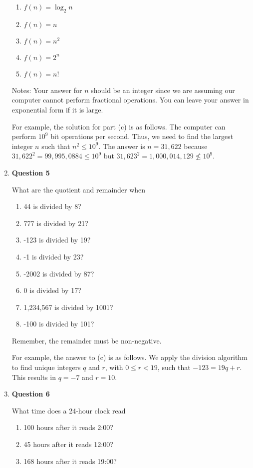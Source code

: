 \documentclass[11pt]{article}
\begin{document}
\begin{enumerate}
\begin{enumerate}[label=(\alph*)]
\item $f(n) = \log_2 n$
\item $f(n) = n$
\item $f(n) = n^2$
\item $f(n) = 2^n$
\item $f(n) = n!$
\end{enumerate}

Notes: Your answer for $n$ should be an integer since we are assuming our computer cannot perform fractional operations. You can leave your answer in exponential form if it is large.

For example, the solution for part (c) is as follows. The computer can perform $10^9$ bit operations per second. Thus, we need to find the largest integer $n$ such that $n^2 \leq 10^9$. The answer is $n=31,622$ because $31,622^2 = 99,995,0884 \leq 10^9$ but $31,623^2 = 1,000,014,129 \nleq 10^9$.

\item
\textbf{Question 5}

What are the quotient and remainder when 

\begin{enumerate}[label=(\alph*)]
\item 44 is divided by 8?
\item 777 is divided by 21?
\item -123 is divided by 19?
\item -1 is divided by 23?
\item -2002 is divided by 87?
\item 0 is divided by 17?
\item 1,234,567 is divided by 1001?
\item -100 is divided by 101?
\end{enumerate}

Remember, the remainder must be non-negative.

For example, the answer to (c) is as follows. We apply the division algorithm to find unique integers $q$ and $r$, with $0 \leq r < 19$, such that $-123 = 19q + r$. This results in $q=-7$ and $r=10$.

\item
\textbf{Question 6}

What time does a 24-hour clock read 

\begin{enumerate}[label=(\alph*)]
\item 100 hours after it reads 2:00?
\item 45 hours after it reads 12:00?
\item 168 hours after it reads 19:00?
\end{enumerate}


\end{enumerate}
\end{document}
